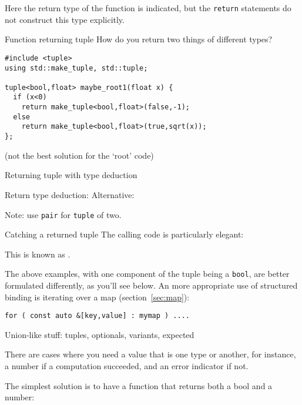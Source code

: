 Here the return type of the function is indicated,
but the \lstinline{return} statements do not
construct this type explicitly.

\begin{slide}{Function returning tuple}
  \label{sl:tupleexplicit}
  How do you return two things of different types?
  \lstset{numbers=left,numberstyle=\tiny}
\begin{lstlisting}
#include <tuple>
using std::make_tuple, std::tuple;

tuple<bool,float> maybe_root1(float x) {
  if (x<0)
    return make_tuple<bool,float>(false,-1);
  else
    return make_tuple<bool,float>(true,sqrt(x));
};
  \end{lstlisting}
(not the best solution for the `root' code) 
\end{slide}

\begin{slide}{Returning tuple with type deduction}
  \label{sl:tuplefun}
  \lstset{numbers=left,numberstyle=\tiny}
  \begin{multicols}{2}
    Return type deduction:
    \columnbreak
    Alternative:
  \end{multicols}
  Note: use \lstinline{pair} for \lstinline{tuple} of two.
\end{slide}

\begin{block}{Catching a returned tuple}
  \label{sl:catch-tuple}
  The calling code is particularly elegant:

  This is known as .
\end{block}

The above examples,
with one component of the tuple being a \lstinline{bool},
are better formulated differently, as you'll see below.
An more appropriate use of structured binding is iterating over a map (section~\ref{sec:map}):
\begin{lstlisting}
for ( const auto &[key,value] : mymap ) ....
\end{lstlisting}

 {Union-like stuff: tuples, optionals, variants, expected}

There are cases where you need a value that is one type or another,
for instance, a number if a computation succeeded, and an error
indicator if not.

The simplest solution is to have a function that returns both a bool
and a number:
%

